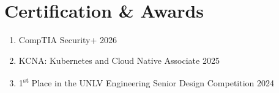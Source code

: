 \documentclass[11pt,letterpaper]{article}
\begin{document}
\section{Certification \& Awards}
\vspace{-0.75em}
\begin{enumerate}[label=\null, left=0pt..0pt, itemsep=0pt]
\parskip=0.2em
  \item CompTIA Security+ \hfill 2026
  \item KCNA: Kubernetes and Cloud Native Associate \hfill 2025
  \item 1\textsuperscript{st} Place in the UNLV Engineering Senior Design Competition \hfill 2024
\end{enumerate}


\end{document}
